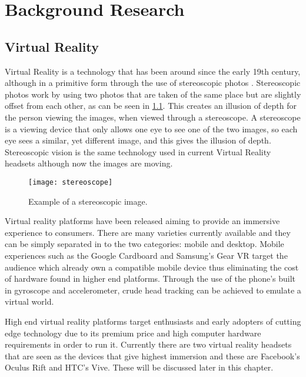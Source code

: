 \chapter{Background Research}
\label{chapter2}


\section{Virtual Reality}
	Virtual Reality is a technology that has been around since the early 19th century, although in a primitive form through the use of stereoscopic photos \cite{stereoscopy}. Stereoscopic photos work by using two photos that are taken of the same place but are slightly offset from each other, as can be seen in \ref{fig:stereoscope1}. This creates an illusion of depth for the person viewing the images, when viewed through a stereoscope. A stereoscope is a viewing device that only allows one eye to see one of the two images, so each eye sees a similar, yet different image, and this gives the illusion of depth. Stereoscopic vision is the same technology used in current Virtual Reality headsets although now the images are moving.\\


\begin{figure}[H]
	\texttt{[image: stereoscope]}
	\centering
	\caption{Example of a stereoscopic image. \cite{leedsstereoscopic}}
	\label{fig:stereoscope1}
\end{figure}

Virtual reality platforms have been released aiming to provide an immersive experience to consumers. There are many varieties currently available and they can be simply separated in to the two categories: mobile and desktop. Mobile experiences such as the Google Cardboard and Samsung's Gear VR target the audience which already own a compatible mobile device thus eliminating the cost of hardware found in higher end platforms. Through the use of the phone's built in gyroscope and accelerometer, crude head tracking can be achieved to emulate a virtual world.

High end virtual reality platforms target enthusiasts and early adopters of cutting edge technology due to its premium price and high computer hardware requirements in order to run it. Currently there are two virtual reality headsets that are seen as the devices that give highest immersion and these are Facebook's Oculus Rift and HTC's Vive. These will be discussed later in this chapter.

